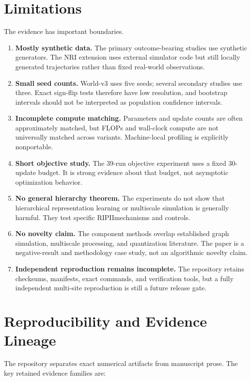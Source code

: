 \documentclass[10pt]{article}
\newcommand{\RIPII}{\textsc{RIPII}}
\begin{document}
\section{Limitations}

The evidence has important boundaries.

\begin{enumerate}
    \item \textbf{Mostly synthetic data.} The primary outcome-bearing studies use synthetic generators. The NRI extension uses external simulator code but still locally generated trajectories rather than fixed real-world observations.
    \item \textbf{Small seed counts.} World-v3 uses five seeds; several secondary studies use three. Exact sign-flip tests therefore have low resolution, and bootstrap intervals should not be interpreted as population confidence intervals.
    \item \textbf{Incomplete compute matching.} Parameters and update counts are often approximately matched, but FLOPs and wall-clock compute are not universally matched across variants. Machine-local profiling is explicitly nonportable.
    \item \textbf{Short objective study.} The 39-run objective experiment uses a fixed 30-update budget. It is strong evidence about that budget, not asymptotic optimization behavior.
    \item \textbf{No general hierarchy theorem.} The experiments do not show that hierarchical representation learning or multiscale simulation is generally harmful. They test specific \RIPII mechanisms and controls.
    \item \textbf{No novelty claim.} The component methods overlap established graph simulation, multiscale processing, and quantization literature. The paper is a negative-result and methodology case study, not an algorithmic novelty claim.
    \item \textbf{Independent reproduction remains incomplete.} The repository retains checksums, manifests, exact commands, and verification tools, but a fully independent multi-site reproduction is still a future release gate.
\end{enumerate}

\section{Reproducibility and Evidence Lineage}

The repository separates exact numerical artifacts from manuscript prose. The key retained evidence families are:
\end{document}
